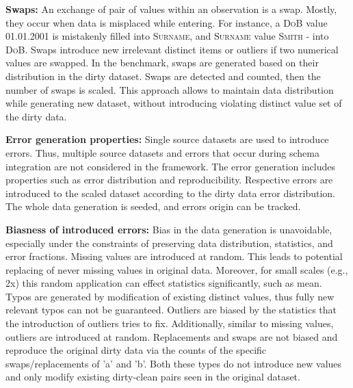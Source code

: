 \textbf{Swaps:} 
An exchange of pair of values within an observation is a swap. 
Mostly, they occur when data is misplaced while entering.
For instance, a \textsc{DoB} value \textsc{01.01.2001} is mistakenly filled into \textsc{Surname}, and \textsc{Surname} value \textsc{Smith} - into \textsc{DoB}.
Swaps introduce new irrelevant distinct items or outliers if two numerical values are swapped.
In the benchmark, swaps are generated based on their distribution in the dirty dataset. Swaps are detected and counted, then the number of swaps is scaled. This approach allows to maintain data distribution while generating new dataset, without introducing violating distinct value set of the dirty data.

\textbf{Error generation properties:} 
Single source datasets are used to introduce errors. 
Thus, multiple source datasets and errors that occur during schema integration are not considered in the framework.
The error generation includes properties such as error distribution and reproducibility. Respective errors are introduced to the scaled dataset according to the dirty data error distribution. The whole data generation is seeded, and errors origin can be tracked.


\textbf{Biasness of introduced errors:} 
Bias in the data generation is unavoidable, especially under the constraints of preserving data distribution, statistics, and error fractions. 
Missing values are introduced at random. This leads to potential replacing of never missing values in original data.
Moreover, for small scales (e.g., 2x) this random application can effect statistics significantly, such as mean.
Typos are generated by modification of existing distinct values, thus fully new relevant typos can not be guaranteed.
Outliers are biased by the statistics that the introduction of outliers tries to fix.
Additionally, similar to missing values, outliers are introduced at random.
Replacements and swaps are not biased and reproduce the original dirty data via the counts of the specific swaps/replacements of 'a' and 'b'.
Both these types do not introduce new values and only modify existing dirty-clean pairs seen in the original dataset.

